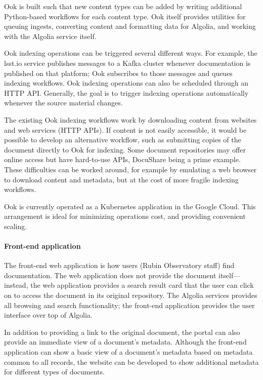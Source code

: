 Ook is built such that new content types can be added by writing additional Python-based workflows for each content type.
Ook itself provides utilities for queuing ingests, converting content and formatting data for Algolia, and working with the Algolia service itself.

Ook indexing operations can be triggered several different ways.
For example, the lsst.io service publishes messages to a Kafka cluster whenever documentation is published on that platform; Ook subscribes to those messages and queues indexing workflows.
Ook indexing operations can also be scheduled through an HTTP API.
Generally, the goal is to trigger indexing operations automatically whenever the source material changes.

The existing Ook indexing workflows work by downloading content from websites and web services (HTTP APIs).
If content is not easily accessible, it would be possible to develop an alternative workflow, such as submitting copies of the document directly to Ook for indexing.
Some document repositories may offer online access but have hard-to-use APIs, DocuShare being a prime example.
These difficulties can be worked around, for example by emulating a web browser to download content and metadata, but at the cost of more fragile indexing workflows.

Ook is currently operated as a Kubernetes application in the Google Cloud.
This arrangement is ideal for minimizing operations cost, and providing convenient scaling.

\paragraph{Front-end application}

The front-end web application is how users (Rubin Observatory staff) find documentation.
The web application does not provide the document itself—instead, the web application provides a search result card that the user can click on to access the document in its original repository.
The Algolia services provides all browsing and search functionality; the front-end application provides the user interface over top of Algolia.

In addition to providing a link to the original document, the portal can also provide an immediate view of a document's metadata.
Although the front-end application can show a basic view of a document's metadata based on metadata common to all records, the website can be developed to show additional metadata for different types of documents.

